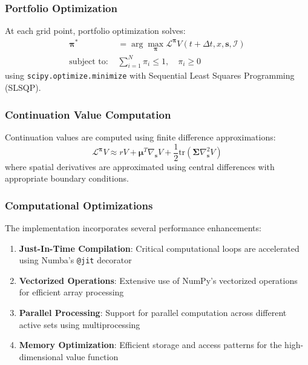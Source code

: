 \documentclass[11pt]{article}
\begin{document}
\subsubsection{Portfolio Optimization}
At each grid point, portfolio optimization solves:
\begin{align}
\boldsymbol{\pi}^* &= \arg\max_{\boldsymbol{\pi}} \mathcal{L}^{\boldsymbol{\pi}} V(t+\Delta t, x, \mathbf{s}, \mathcal{I}) \\
\text{subject to: } &\sum_{i=1}^N \pi_i \leq 1, \quad \pi_i \geq 0
\end{align}
using \texttt{scipy.optimize.minimize} with Sequential Least Squares Programming (SLSQP).

\subsubsection{Continuation Value Computation}
Continuation values are computed using finite difference approximations:
\begin{equation}
\mathcal{L}^{\boldsymbol{\pi}} V \approx rV + \boldsymbol{\mu}^T \nabla_{\mathbf{s}} V + \frac{1}{2} \text{tr}(\boldsymbol{\Sigma} \nabla^2_{\mathbf{s}} V)
\end{equation}
where spatial derivatives are approximated using central differences with appropriate boundary conditions.

\subsubsection{Computational Optimizations}
The implementation incorporates several performance enhancements:
\begin{enumerate}
\item \textbf{Just-In-Time Compilation}: Critical computational loops are accelerated using Numba's \texttt{@jit} decorator
\item \textbf{Vectorized Operations}: Extensive use of NumPy's vectorized operations for efficient array processing
\item \textbf{Parallel Processing}: Support for parallel computation across different active sets using multiprocessing
\item \textbf{Memory Optimization}: Efficient storage and access patterns for the high-dimensional value function
\end{enumerate}
\end{document}
